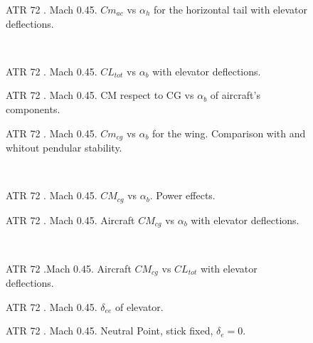 \begin{figure}[H]
\centering

\caption{ATR 72 . Mach 0.45. $Cm_{ac}$ vs $\alpha_h$ for the horizontal tail with elevator deflections.}
\label{fig:stallATR}
\end{figure}
\noindent\\
\begin{figure}[H]
\centering

\caption{ATR 72 . Mach 0.45. $CL_{tot}$ vs $\alpha_b$ with elevator deflections.}
\label{fig:stallATR}
\end{figure}
\begin{figure}[H]
\centering

\caption{ATR 72 . Mach 0.45. CM respect to CG vs $\alpha_b$ of aircraft's components.}
\label{fig:stallATR}
\end{figure}
\begin{figure}[H]
\centering

\caption{ATR 72 . Mach 0.45. $Cm_{cg}$ vs $\alpha_b$ for the wing. Comparison with and whitout pendular stability.}
\label{fig:stallATR}
\end{figure}
\noindent\\
\begin{figure}[H]
\centering

\caption{ATR 72 . Mach 0.45. $CM_{cg}$ vs $\alpha_b$. Power effects.}
\label{fig:stallATR}
\end{figure}
\begin{figure}[H]
\centering

\caption{ATR 72 . Mach 0.45. Aircraft $CM_{cg}$ vs $\alpha_b$ with elevator deflections.}
\label{fig:stallATR}
\end{figure}
\noindent\\
\begin{figure}[H]
\centering

\caption{ATR 72 .Mach 0.45. Aircraft $CM_{cg}$ vs $CL_{tot}$ with elevator deflections.}
\label{fig:stallATR}
\end{figure}
\begin{figure}[H]
\centering

\caption{ATR 72 . Mach 0.45. $\delta_{ee}$ of elevator.}
\label{fig:stallATR}
\end{figure}
\begin{figure}[H]
\centering

\caption{ATR 72 . Mach 0.45. Neutral Point, stick fixed, $\delta_e = 0 $.}
\label{fig:stallATR}
\end{figure}
